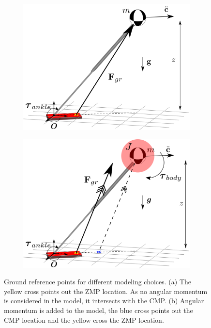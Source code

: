 \begin{figure}[h]
\centering
\begin{subfigure}{0.49\textwidth}
\centering
\includegraphics[width=.95\linewidth]{STYLESTUFF/3DCoPviz.png}
\caption{}
\label{fig:3dlipfoot}
\end{subfigure}
\begin{subfigure}{0.49\textwidth}
\centering
\includegraphics[width=.95\linewidth]{STYLESTUFF/3DCMPCoPviz.png}	
\caption{}
\label{fig:3dlipfootinertia}
\end{subfigure}
\caption{Ground reference points for different modeling choices. (a) The yellow cross points out the \ac{ZMP} location. As no angular momentum is considered in the model, it intersects with the \ac{CMP}. (b) Angular momentum is added to the model, the blue cross points out the \ac{CMP} location and the yellow cross the \ac{ZMP} location.}
\label{fig:zmpvscmp}
\end{figure}


